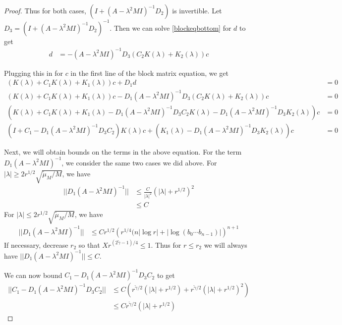 \documentclass[thesis.tex]{subfiles}
\begin{document}
\begin{lemma}
\begin{proof}
Thus for both cases, $(I + (A - \lambda^2 MI)^{-1} D_2)$ is invertible. Let $D_3 = (I + (A - \lambda^2 MI)^{-1} D_2)^{-1}$. Then we can solve \eqref{blockeqbottom} for $d$ to get
\begin{align*}
d &= -(A - \lambda^2 MI)^{-1} D_3 (C_2 K(\lambda) + K_2(\lambda))c
\end{align*}

Plugging this in for $c$ in the first line of the block matrix equation, we get
\begin{align*}
(K(\lambda) + C_1 K(\lambda) + K_1(\lambda))c + D_1 d &= 0 \\
(K(\lambda) + C_1 K(\lambda) + K_1(\lambda))c - D_1 (A - \lambda^2 MI)^{-1} D_3 (C_2 K(\lambda) + K_2(\lambda))c &= 0 \\
(K(\lambda) + C_1 K(\lambda) + K_1(\lambda) - D_1 (A - \lambda^2 MI)^{-1} D_3 C_2 K(\lambda) - D_1 (A - \lambda^2 MI)^{-1} D_3 K_2(\lambda))c &= 0 \\
(I + C_1 - D_1 (A - \lambda^2 MI)^{-1} D_3 C_2) K(\lambda)c + (K_1(\lambda) - D_1 (A - \lambda^2 MI)^{-1} D_3 K_2(\lambda))c &= 0
\end{align*}

Next, we will obtain bounds on the terms in the above equation. For the term $D_1 (A - \lambda^2 MI)^{-1}$, we consider the same two cases we did above. For $|\lambda| \geq 2 r^{1/2} \sqrt{\tilde{\mu}_M/M}$, we have
\begin{align*}
|| D_1 (A - \lambda^2 MI)^{-1} || &\leq \frac{C}{|\lambda|^2} (|\lambda| + r^{1/2})^2 \\ 
&\leq C
\end{align*}
For $|\lambda| \leq 2 r^{1/2} \sqrt{\tilde{\mu}_M/M}$, we have
\begin{align*}
|| D_1 (A - \lambda^2 MI)^{-1} || &\leq C r^{1/2} \left( r^{1/4} (n |\log r| + |\log(b_0\cdots b_{n-1})| \right)^{n+1}
\end{align*}
If necessary, decrease $r_2$ so that $X r^{(2 \tilde{\gamma} - 1)/4} \leq 1$. Thus for $r \leq r_2$ we will always have $|| D_1 (A - \lambda^2 MI)^{-1} || \leq C$.

We can now bound $C_1 - D_1 (A - \lambda^2 MI)^{-1} D_3 C_2$ to get
\begin{align*}
|| C_1 - D_1 (A - \lambda^2 MI)^{-1} D_3 C_2 || &\leq C \left( r^{\tilde{\gamma}/2} (|\lambda| + r^{1/2}) + r^{\tilde{\gamma}/2} (|\lambda| + r^{1/2})^2 \right) \\
&\leq C r^{\tilde{\gamma}/2} (|\lambda| + r^{1/2}) 
\end{align*}


\end{proof}
\end{lemma}
\end{document}
